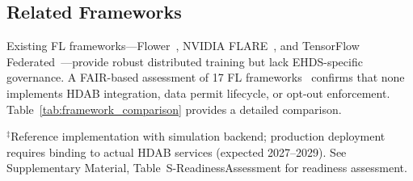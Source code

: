 \documentclass[conference]{IEEEtran}
\begin{document}
\subsection{Related Frameworks}

Existing FL frameworks---Flower~\cite{beutel2023flower}, NVIDIA FLARE~\cite{nvflare2023}, and TensorFlow Federated~\cite{tff2019}---provide robust distributed training but lack EHDS-specific governance. A FAIR-based assessment of 17 FL frameworks~\cite{chaverodiez2026fair} confirms that none implements HDAB integration, data permit lifecycle, or opt-out enforcement. Table~\ref{tab:framework_comparison} provides a detailed comparison.

\begin{table}[htbp]
\centering
\caption{Framework Comparison: FL-EHDS vs Existing FL Frameworks}
\label{tab:framework_comparison}

\vspace{1mm}
\footnotesize{$^\ddagger$Reference implementation with simulation backend; production deployment requires binding to actual HDAB services (expected 2027--2029). See Supplementary Material, Table~S-ReadinessAssessment for readiness assessment.}
\end{table}
\end{document}
